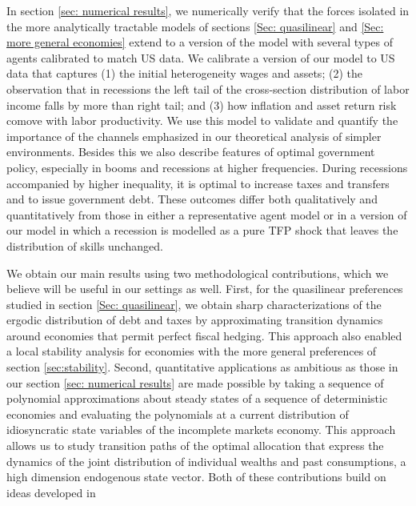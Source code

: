 \documentclass[thmsb,11pt]{article}
\begin{document}


In section \ref{sec: numerical results},
we numerically verify that the forces isolated in the more analytically tractable  models of sections \ref{Sec: quasilinear}
  and \ref{Sec: more general economies} extend to a version of the model with several types of agents  calibrated to match US data.
We calibrate a version of our model to US data that captures (1) the initial heterogeneity wages and assets;
(2) the observation  that  in recessions the left tail of the cross-section distribution of labor income falls by more than right tail; and (3) how inflation and asset return risk comove with labor productivity. 
We use this model to validate and quantify the importance of the channels  emphasized in our theoretical analysis of simpler environments. Besides this we also describe features of optimal government policy, especially in booms and recessions at higher frequencies.
During recessions accompanied by higher inequality, it is  optimal to increase taxes and transfers and to issue
government debt. %
These outcomes differ both qualitatively and quantitatively from those in either a representative agent model or in a version
of our model in which a  recession is modelled as a pure TFP shock that leaves the distribution of skills unchanged.


We obtain our main results using two methodological contributions, which we believe will be useful in our settings as well. First, for the quasilinear preferences studied in section \ref{Sec: quasilinear}, we obtain sharp characterizations of the ergodic distribution of debt and taxes by approximating transition dynamics around economies that permit perfect fiscal hedging. This approach also enabled a local stability analysis for economies with the more general preferences of section \ref{sec:stability}. Second, quantitative applications as ambitious as those in our section \ref{sec: numerical results} are made possible by taking a sequence of polynomial approximations about steady states of a sequence of deterministic economies and evaluating the
polynomials at a current distribution of idiosyncratic state variables of the incomplete markets economy. This approach allows us to study transition paths of the optimal allocation that express the dynamics of the joint distribution of individual wealths and past consumptions, a high dimension endogenous state vector. Both of these contributions build on ideas developed in \cite{Evans2014} 
\end{document}

